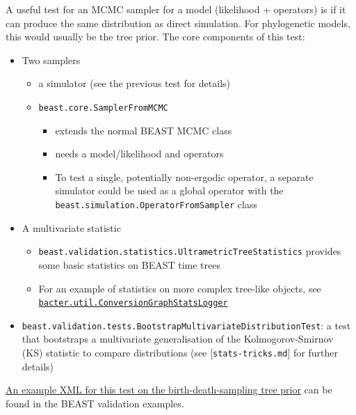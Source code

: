 \documentclass[oneside]{article}
\begin{document}
A useful test for an MCMC sampler for a model (likelihood + operators)
is if it can produce the same distribution as direct simulation. For
phylogenetic models, this would usually be the tree prior. The core
components of this test:

\begin{itemize}
\item
  Two samplers

  \begin{itemize}
  \item
    a simulator (see the previous test for details)
  \item
    \texttt{beast.core.SamplerFromMCMC}

    \begin{itemize}
    \item
      extends the normal BEAST MCMC class
    \item
      needs a model/likelihood and operators
    \item
      To test a single, potentially non-ergodic operator, a separate
      simulator could be used as a global operator with the
      \texttt{beast.simulation.OperatorFromSampler} class
    \end{itemize}
  \end{itemize}
\item
  A multivariate statistic

  \begin{itemize}
  \item
    \texttt{beast.validation.statistics.UltrametricTreeStatistics}
    provides some basic statistics on BEAST time trees
  \item
    For an example of statistics on more complex tree-like objects, see
    \href{https://github.com/tgvaughan/bacter/blob/master/src/bacter/util/ConversionGraphStatsLogger.java}{\texttt{bacter.util.ConversionGraphStatsLogger}}
  \end{itemize}
\item
  \texttt{beast.validation.tests.BootstrapMultivariateDistributionTest}:
  a test that bootstraps a multivariate generalisation of the
  Kolmogorov-Smirnov (KS) statistic to compare distributions (see
  {[}\texttt{stats-tricks.md}{]} for further details)
\end{itemize}

\href{https://github.com/christiaanjs/beast-validation/blob/master/examples/birth-death-sampling-prior-sampling-test.xml}{An
example XML for this test on the birth-death-sampling tree prior} can be
found in the BEAST validation examples.
\end{document}
